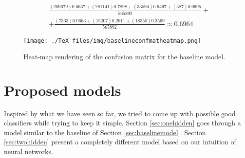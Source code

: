 \begin{equation}
\label{eq:weighavgprec}
\begin{aligned}
&\frac{(209679)0.6637 + (281141)0.7898 + (33594)0.6497+(587)0.0695}{565892}+ \\
&+\frac{(7333)0.0663 + (15207)0.2611 + (18350)0.3569}{565892} \approx 0.6964.
\end{aligned}
\end{equation}
\begin{figure}
\centering
\texttt{[image: ./TeX\_files/img/baselineconfmatheatmap.png]}
\caption{Heat-map rendering of the confusion matrix for the baseline model.}
\label{fig:baselineconfmatheatmap}
\end{figure}
\begin{table}
\centering
{}
\caption{Precision, recall, f1-score summary table for the baseline model. Support indicates the number of occurrences of each particular class in the true responses (for the test set). Weighted avg is the per metric weighted average where the weights correspond to the support of that class.}
\label{tab:baselineclassificationrep}
\end{table}
\section{Proposed models}
Inspired by what we have seen so far, we tried to come up with possible good classifiers while trying to keep it simple. Section \ref{sec:onehidden} goes through a model similar to the baseline of Section \ref{sec:baselinemodel}. Section \ref{sec:twohidden} present a completely different model based on our intuition of neural networks.
